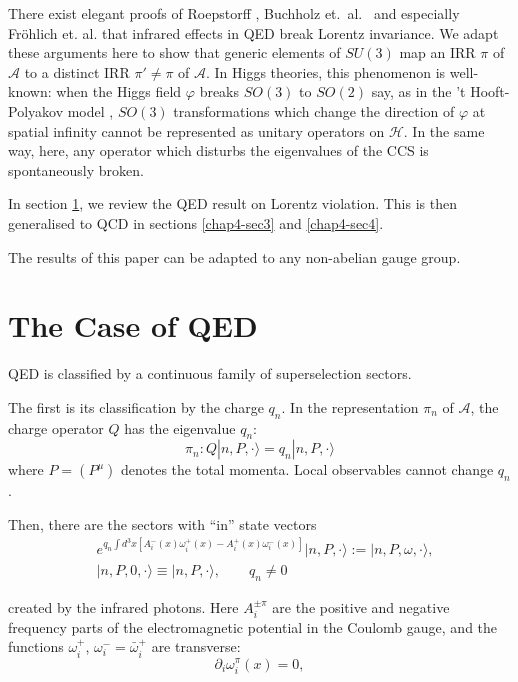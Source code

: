 There exist elegant proofs of Roepstorff \cite{chap4-key6}, Buchholz et.\ al.\ \cite{chap4-key2} and especially Fr\"ohlich et. al. \cite{chap4-key3} that infrared effects in QED break Lorentz invariance. We adapt these arguments here to show that generic elements of $SU(3)$ map an IRR $\pi$ of $\mathcal{A}$ to a distinct IRR $\pi'\neq \pi$ of $\mathcal{A}$. In Higgs theories, this phenomenon is well-known: when the Higgs field $\varphi$ breaks $SO(3)$ to $SO(2)$ say, as in the 't Hooft-Polyakov model \cite{chap4-key7}, $SO(3)$ transformations which change the direction of $\varphi$ at spatial infinity cannot be represented as unitary operators on $\mathcal{H}$. In the same way, here, any operator which disturbs the eigenvalues of the CCS is spontaneously broken.

In section \ref{chap4-sec2}, we review the QED result on Lorentz violation. This is then generalised to QCD in sections \ref{chap4-sec3} and \ref{chap4-sec4}.

The results of this paper can be adapted to any non-abelian gauge group.

\section{The Case of QED}\label{chap4-sec2}

QED is classified by a continuous family of superselection sectors.

The first is its classification by the charge $q_{n}$. In the representation $\pi_{n}$ of $\mathcal{A}$, the charge operator $Q$ has the eigenvalue $q_{n}$:
\begin{equation}
\pi_{n}: Q|n,P,\cdot \rangle=q_{n}|n,P,\cdot\rangle\label{chap4-eq2.1}
\end{equation}
where $P = (P^{\mu})$ denotes the total momenta. Local observables cannot change $q_{n}$.

Then, there are the sectors with ``in'' state vectors \cite{chap4-key4}
\begin{align}
& e^{q_{n}\int d^{3}x[A^{-}_{i}(x)\omega^{+}_{i}(x)-A^{+}_{i}(x)\omega^{-}_{i}(x)]}|n,P,\cdot\rangle := |n,P,\omega,\cdot\rangle,\label{chap4-eq2.2}\\
& |n,P,0,\cdot\rangle \equiv |n,P,\cdot\rangle,\qquad q_{n}\neq 0\label{chap4-eq2.3}
\end{align}

created by the infrared photons. Here $A^{\pm \pi}_{i}$ are the positive and negative frequency parts of the electromagnetic potential in the Coulomb gauge, and the functions $\omega^{+}_{i}$, $\omega^{-}_{i}=\bar{\omega}^{+}_{i}$ are transverse:
\begin{equation}
\partial_{i}\omega^{\pi}_{i}(x)=0,\label{chap4-eq2.4}
\end{equation}

